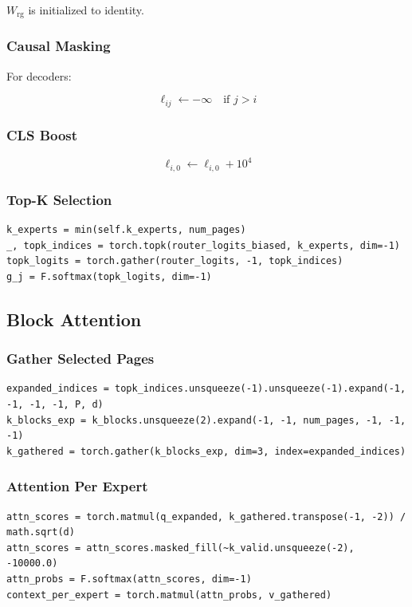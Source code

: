 $W_\text{rg}$ is initialized to identity.

\subsubsection{Causal Masking}

For decoders:

\[
\ell_{ij} \leftarrow -\infty \quad \text{if } j > i
\tag{4.2}
\]

\subsubsection{CLS Boost}

\[
\ell_{i, 0} \leftarrow \ell_{i, 0} + 10^4
\tag{4.3}
\]

\subsubsection{Top-K Selection}

\begin{lstlisting}
k_experts = min(self.k_experts, num_pages)
_, topk_indices = torch.topk(router_logits_biased, k_experts, dim=-1)
topk_logits = torch.gather(router_logits, -1, topk_indices)
g_j = F.softmax(topk_logits, dim=-1)
\end{lstlisting}

\subsection{Block Attention}

\subsubsection{Gather Selected Pages}

\begin{lstlisting}
expanded_indices = topk_indices.unsqueeze(-1).unsqueeze(-1).expand(-1, -1, -1, -1, P, d)
k_blocks_exp = k_blocks.unsqueeze(2).expand(-1, -1, num_pages, -1, -1, -1)
k_gathered = torch.gather(k_blocks_exp, dim=3, index=expanded_indices)
\end{lstlisting}

\subsubsection{Attention Per Expert}

\begin{lstlisting}
attn_scores = torch.matmul(q_expanded, k_gathered.transpose(-1, -2)) / math.sqrt(d)
attn_scores = attn_scores.masked_fill(~k_valid.unsqueeze(-2), -10000.0)
attn_probs = F.softmax(attn_scores, dim=-1)
context_per_expert = torch.matmul(attn_probs, v_gathered)
\end{lstlisting}

